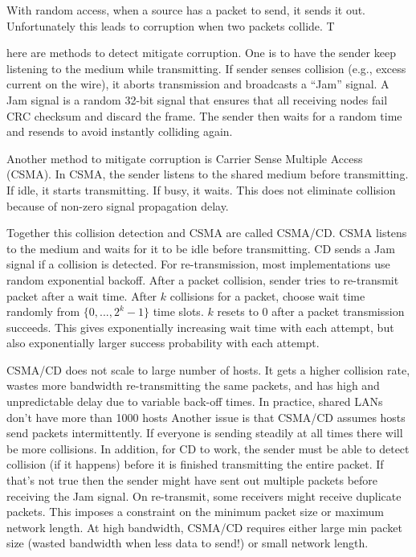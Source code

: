With random access, when a source has a packet to send,
it sends it out. Unfortunately this leads to corruption
when two packets collide. T

here are methods to detect mitigate
corruption. One is to have the sender keep listening to
the medium while transmitting. If sender senses collision
(e.g., excess current on the wire), it aborts transmission
and broadcasts a “Jam” signal. A Jam signal is a random
32-bit signal that ensures that all receiving nodes fail
CRC checksum and discard the frame. The sender then
waits for a random time and resends to avoid instantly
colliding again.

Another method to mitigate corruption is
Carrier Sense Multiple Access (CSMA). In CSMA, the sender
listens to the shared medium before transmitting.
If idle, it starts transmitting. If busy, it waits.
This does not eliminate collision because of non-zero
signal propagation delay.

Together this collision detection and CSMA are called CSMA/CD.
CSMA listens to the medium and waits for it to be idle before
transmitting. CD sends a Jam signal if a collision is detected.
For re-transmission, most implementations use random
exponential backoff.
After a packet collision, sender tries to re-transmit
packet after a wait time. After $k$ collisions for a packet,
choose wait time randomly from $\{0,...,2^k - 1\}$ time slots.
$k$ resets to 0 after a packet transmission succeeds. This
gives exponentially increasing wait time with each attempt, but
also exponentially larger success probability with each attempt.

CSMA/CD does not scale to large number of hosts.
It gets a higher collision rate, wastes more bandwidth
re-transmitting the same packets, and has high and unpredictable
delay due to variable back-off times.
In practice, shared LANs don't have more than 1000 hosts
Another issue is that CSMA/CD assumes hosts send packets intermittently.
If everyone is sending steadily at all times there will be
more collisions. In addition, for CD to work, the sender must be
able to detect collision (if it
happens) before it is finished transmitting the entire packet.
If that's not true then the sender might have sent out multiple
packets before receiving the Jam signal. On re-transmit,
some receivers might receive duplicate packets. This
imposes a constraint on the
minimum packet size or maximum network length.
At high bandwidth, CSMA/CD requires either
large min packet size (wasted bandwidth when less data to send!)
or small network length.

